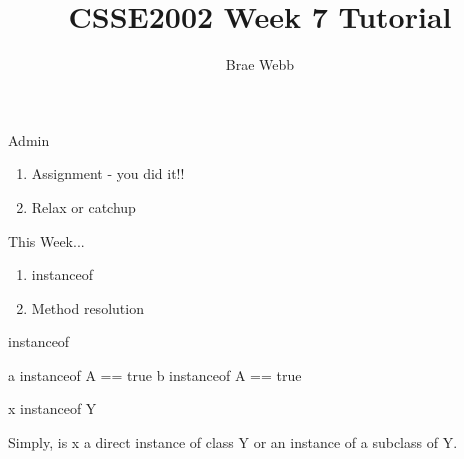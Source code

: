 \documentclass[week7]{csse2002}
\author{Brae Webb}
\title{CSSE2002 Week 7 Tutorial}
\begin{document}
\begin{frame}
\maketitle
\end{frame}

\begin{topic}{Admin}
\begin{enumerate}
    \item Assignment - you did it!! 🎉
    \item Relax or catchup
\end{enumerate}
\end{topic}


\begin{topic}{This Week...}
\begin{enumerate}
    \item instanceof
    \item Method resolution
\end{enumerate}
\end{topic}

\begin{topic}{instanceof}
\begin{java}
a instanceof A == true
b instanceof A == true

x instanceof Y
\end{java}

Simply, is x a direct instance of class Y or an instance of a subclass of Y.
\end{topic}
\end{document}

